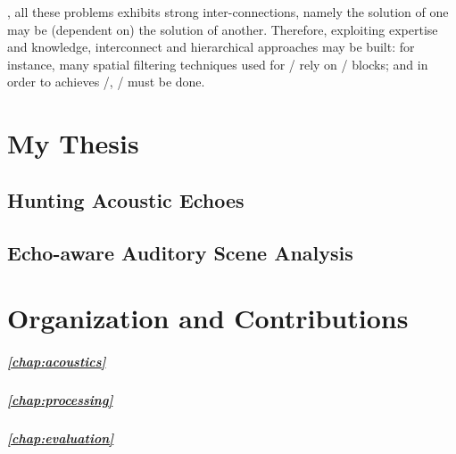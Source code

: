 


, all these problems exhibits strong inter-connections,
namely the solution of one may be (dependent on) the solution of another.
Therefore, exploiting expertise and knowledge,
interconnect and hierarchical approaches may be built:
for instance, many spatial filtering techniques used for \SE/ rely on \SSL/ blocks;
and in order to achieves \RooGE/, \AER/ must be done.


\section{My Thesis}
\subsection{Hunting Acoustic Echoes}
\subsection{Echo-aware Auditory Scene Analysis}


\section{Organization and Contributions}
\subparagraph{\cref{chap:acoustics}}\blindtext
\subparagraph{\cref{chap:processing}}\blindtext
\subparagraph{\cref{chap:evaluation}}\blindtext

